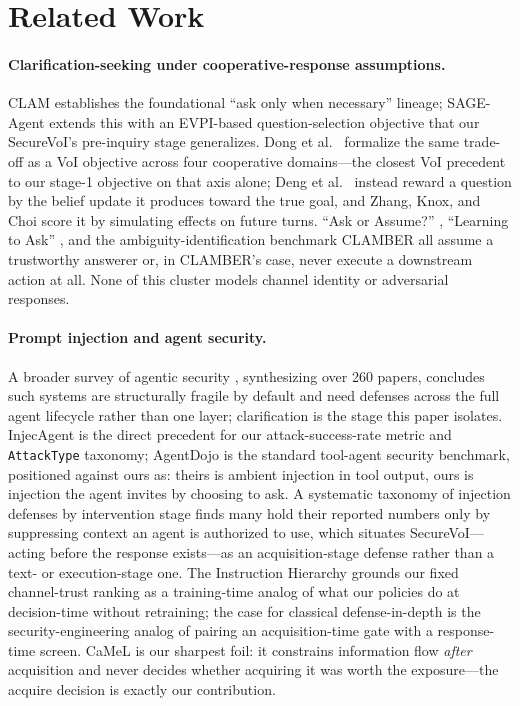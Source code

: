 \documentclass[letterpaper]{article} %
\begin{document}
\section{Related Work}

\paragraph{Clarification-seeking under cooperative-response assumptions.}
CLAM \citep{kuhn2023clam} establishes the foundational ``ask only when necessary''
lineage; SAGE-Agent \citep{suri2025sageagent} extends this with an EVPI-based
question-selection objective that our SecureVoI's pre-inquiry stage generalizes.
Dong et al.\ \citep{dong2026voi} formalize the same trade-off as a VoI
objective across four cooperative domains---the closest VoI precedent to our
stage-1 objective on that axis alone; Deng et al.\ \citep{deng2026infogain}
instead reward a question by the belief update it produces toward the true
goal, and Zhang, Knox, and Choi \citep{zhang2025futureturns} score it by
simulating effects on future turns. ``Ask or Assume?''
\citep{edwards2026askorassume}, ``Learning to Ask''
\citep{wang2024learningtoask}, and the ambiguity-identification benchmark
CLAMBER \citep{zhang2024clamber} all assume a trustworthy answerer or, in
CLAMBER's case, never execute a downstream action at all. None of this cluster
models channel identity or adversarial responses.

\paragraph{Prompt injection and agent security.}
A broader survey of agentic security \citep{shahriar2025survey}, synthesizing
over 260 papers, concludes such systems are structurally fragile by default
and need defenses across the full agent lifecycle rather than one layer;
clarification is the stage this paper isolates. InjecAgent \citep{zhan2024injecagent} is the direct precedent for our attack-success-rate
metric and \texttt{AttackType} taxonomy; AgentDojo \citep{debenedetti2024agentdojo} is the
standard tool-agent security benchmark, positioned against ours as: theirs is
ambient injection in tool output, ours is injection the agent invites by choosing
to ask. A systematic taxonomy of injection defenses by intervention stage
\citep{wang2026landscape} finds many hold their reported numbers only by
suppressing context an agent is authorized to use, which situates
SecureVoI---acting before the response exists---as an acquisition-stage
defense rather than a text- or execution-stage one. The Instruction Hierarchy \citep{wallace2024instructionhierarchy} grounds our fixed
channel-trust ranking as a training-time analog of what our policies do at
decision-time without retraining; the case for classical defense-in-depth
\citep{zhang2025securityprinciples} is the security-engineering analog of
pairing an acquisition-time gate with a response-time screen. CaMeL \citep{debenedetti2025camel} is our sharpest
foil: it constrains information flow \emph{after} acquisition and never decides
whether acquiring it was worth the exposure---the acquire decision is exactly
our contribution.
\end{document}

